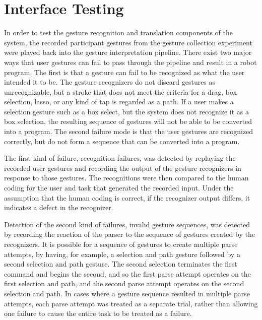 \section{Interface Testing}

In order to test the gesture recognition and translation components of the system, the recorded participant gestures from the gesture collection experiment were played back into the gesture interpretation pipeline. 
There exist two major ways that user gestures can fail to pass through the pipeline and result in a robot program. 
The first is that a gesture can fail to be recognized as what the user intended it to be. 
The gesture recognizers do not discard gestures as unrecognizable, but a stroke that does not meet the criteria for a drag, box selection, lasso, or any kind of tap is regarded as a path. 
If a user makes a selection gesture such as a box select, but the system does not recognize it as a box selection, the resulting sequence of gestures will not be able to be converted into a program. 
The second failure mode is that the user gestures are recognized correctly, but do not form a sequence that can be converted into a program. 

The first kind of failure, recognition failures, was detected by replaying the recorded user gestures and recording the output of the gesture recognizers in response to those gestures. 
The recognitions were then compared to the human coding for the user and task that generated the recorded input. 
Under the assumption that the human coding is correct, if the recognizer output differs, it indicates a defect in the recognizer. 

Detection of the second kind of failures, invalid gesture sequences, was detected by recording the reaction of the parser to the sequence of gestures created by the recognizers. 
It is possible for a sequence of gestures to create multiple parse attempts, by having, for example, a selection and path gesture followed by a second selection and path gesture.
The second selection terminates the first command and begins the second, and so the first parse attempt operates on the first selection and path, and the second parse attempt operates on the second selection and path. 
In cases where a gesture sequence resulted in multiple parse attempts, each parse attempt was treated as a separate trial, rather than allowing one failure to cause the entire task to be treated as a failure.  


